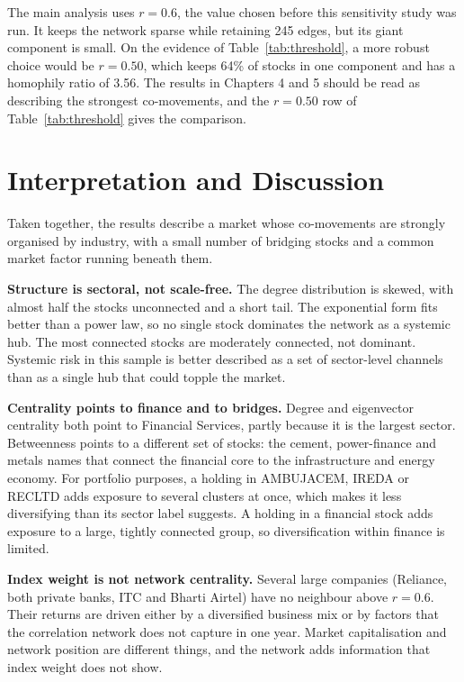 \documentclass[12pt,a4paper]{report}
\begin{document}
The main analysis uses $r=0.6$, the value chosen before this sensitivity study was run. It keeps the network sparse while retaining 245 edges, but its giant component is small. On the evidence of Table~\ref{tab:threshold}, a more robust choice would be $r=0.50$, which keeps 64\% of stocks in one component and has a homophily ratio of 3.56. The results in Chapters 4 and 5 should be read as describing the strongest co-movements, and the $r=0.50$ row of Table~\ref{tab:threshold} gives the comparison.

\chapter{Interpretation and Discussion}

Taken together, the results describe a market whose co-movements are strongly organised by industry, with a small number of bridging stocks and a common market factor running beneath them. 

\textbf{Structure is sectoral, not scale-free.} The degree distribution is skewed, with almost half the stocks unconnected and a short tail. The exponential form fits better than a power law, so no single stock dominates the network as a systemic hub. The most connected stocks are moderately connected, not dominant. Systemic risk in this sample is better described as a set of sector-level channels than as a single hub that could topple the market.

\textbf{Centrality points to finance and to bridges.} Degree and eigenvector centrality both point to Financial Services, partly because it is the largest sector. Betweenness points to a different set of stocks: the cement, power-finance and metals names that connect the financial core to the infrastructure and energy economy. For portfolio purposes, a holding in AMBUJACEM, IREDA or RECLTD adds exposure to several clusters at once, which makes it less diversifying than its sector label suggests. A holding in a financial stock adds exposure to a large, tightly connected group, so diversification within finance is limited.

\textbf{Index weight is not network centrality.} Several large companies (Reliance, both private banks, ITC and Bharti Airtel) have no neighbour above $r=0.6$. Their returns are driven either by a diversified business mix or by factors that the correlation network does not capture in one year. Market capitalisation and network position are different things, and the network adds information that index weight does not show.
\end{document}
